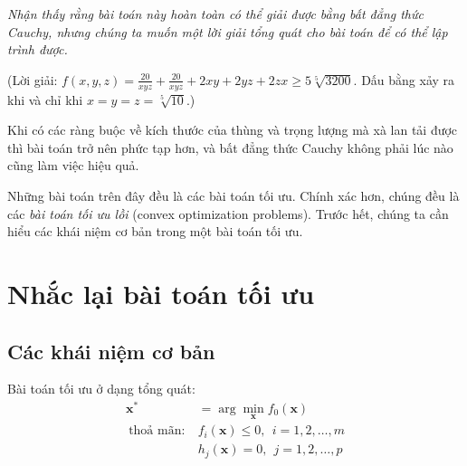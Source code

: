 \textit{Nhận thấy rằng bài toán này hoàn toàn có thể giải được bằng bất
đẳng thức Cauchy, nhưng chúng ta muốn một lời giải tổng quát cho bài toán để có thể lập trình được.}

(Lời giải:
$f(x, y, z)= \frac{20}{xyz} + \frac{20}{xyz} + 2xy + 2yz + 2zx
\geq 5\sqrt[5]{3200} $.
Dấu bằng xảy ra khi và chỉ khi $x = y = z = \sqrt[5]{10}$.)

Khi có các ràng buộc về kích thước của thùng và trọng lượng mà xà lan tải được
thì bài toán trở nên phức tạp hơn, và bất đẳng thức Cauchy không phải lúc nào cũng làm việc hiệu quả.


Những bài toán trên đây đều là các bài toán tối ưu. Chính xác hơn, chúng đều
là các \textit{bài toán tối ưu lồi} ({convex optimization problems}). Trước hết, chúng ta cần hiểu các khái niệm cơ bản trong một bài toán tối ưu.


\section{Nhắc lại bài toán tối ưu}

\subsection{Các khái niệm cơ bản}
Bài toán tối ưu ở dạng tổng quát:
\begin{equation}
\label{eqn:17_optprob1}
\begin{aligned}
\mathbf{x}^* &= \arg\min_{\mathbf{x}} f_0(\mathbf{x}) \\\
\text{thoả mãn:}~ & f_i(\mathbf{x}) \leq 0, ~~ i = 1, 2, \dots,m \\\
& h_j(\mathbf{x}) = 0, ~~ j = 1, 2, \dots, p
\end{aligned}
\end{equation}




